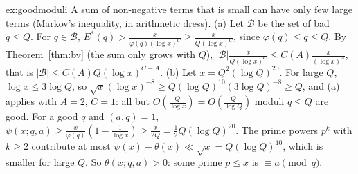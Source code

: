 \begin{solution}{ex:goodmoduli}
\idea A sum of non-negative terms that is small can have only few large terms (Markov's inequality, in arithmetic dress).
\writeup (a) Let $\mathcal B$ be the set of bad $q\le Q$. For $q\in\mathcal B$, $E^*(q)>\frac x{\varphi(q)(\log x)^C}\ge\frac x{Q(\log x)^C}$, since $\varphi(q)\le q\le Q$. By Theorem~\ref{thm:bv} (the sum only grows with $Q$), $|\mathcal B|\frac x{Q(\log x)^C}\le C(A)\frac x{(\log x)^A}$, that is $|\mathcal B|\le C(A)Q(\log x)^{C-A}$.
(b) Let $x=Q^2(\log Q)^{20}$. For large $Q$, $\log x\le3\log Q$, so $\sqrt x(\log x)^{-8}\ge Q(\log Q)^{10}(3\log Q)^{-8}\ge Q$, and (a) applies with $A=2$, $C=1$: all but $O(\frac Q{\log x})=O(\frac Q{\log Q})$ moduli $q\le Q$ are good. For a good $q$ and $(a,q)=1$, $\psi(x;q,a)\ge\frac x{\varphi(q)}(1-\frac1{\log x})\ge\frac x{2Q}=\frac12Q(\log Q)^{20}$. The prime powers $p^k$ with $k\ge2$ contribute at most $\psi(x)-\theta(x)\ll\sqrt x=Q(\log Q)^{10}$, which is smaller for large $Q$. So $\theta(x;q,a)>0$: some prime $p\le x$ is $\equiv a\pmod q$.
\end{solution}

